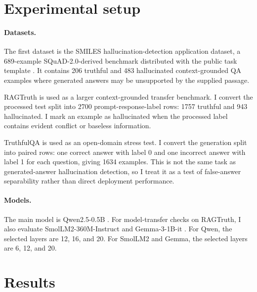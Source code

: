 \documentclass{article}
\begin{document}
\section{Experimental setup}

\paragraph{Datasets.}
The first dataset is the SMILES hallucination-detection application dataset, a 689-example
SQuAD-2.0-derived benchmark distributed with the public task template
\citep{rajpurkar2018squad2,smiles2026repo}. It contains 206 truthful and 483 hallucinated
context-grounded QA examples where generated answers may be unsupported by the supplied passage.

RAGTruth \citep{wu2024ragtruth} is used as a larger context-grounded transfer benchmark. I convert
the processed test split into 2700 prompt-response-label rows: 1757 truthful and 943 hallucinated.
I mark an example as hallucinated when the processed label contains evident conflict or baseless
information.

TruthfulQA \citep{lin2022truthfulqa} is used as an open-domain stress test. I convert the generation
split into paired rows: one correct answer with label 0 and one incorrect answer with label 1 for
each question, giving 1634 examples. This is not the same task as generated-answer hallucination
detection, so I treat it as a test of false-answer separability rather than direct deployment
performance.

\paragraph{Models.}
The main model is Qwen2.5-0.5B \citep{qwen2025qwen25}. For model-transfer checks on RAGTruth, I
also evaluate SmolLM2-360M-Instruct \citep{allal2025smollm2} and Gemma-3-1B-it
\citep{gemma2025gemma3}. For Qwen, the selected layers are 12, 16, and 20. For SmolLM2 and Gemma,
the selected layers are 6, 12, and 20.

\section{Results}
\end{document}

